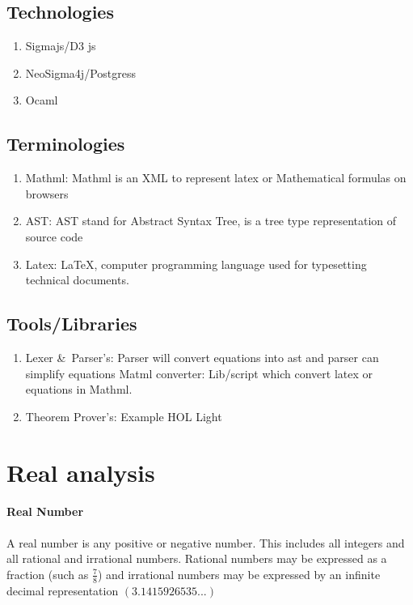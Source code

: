 \documentclass[15]{article}
\begin{document}
\subsection*{Technologies}


\begin{enumerate}
\item Sigmajs/D3 js
\item NeoSigma4j/Postgress
\item Ocaml 
   
\end{enumerate}

\subsection*{Terminologies}

\begin{enumerate}
\item Mathml: Mathml is an XML to represent latex or Mathematical formulas  on browsers
\item AST: AST stand for Abstract Syntax Tree, is  a tree type representation of source code
\item Latex: LaTeX, computer programming language used for typesetting technical documents. 


\end{enumerate}



\subsection*{Tools/Libraries}

\begin{enumerate}
\item Lexer \&\ Parser's:  Parser will convert equations into ast and parser can simplify equations
Matml converter: Lib/script which convert latex or equations in Mathml.

\item Theorem Prover's: Example HOL Light

\end{enumerate}
\pagebreak

\section{Real analysis}

\paragraph{Real Number}
A real number is any positive or negative number. This includes all integers and all rational and irrational numbers. Rational numbers may be expressed as a fraction (such as $\frac{7}{8}$) and irrational numbers may be expressed by an infinite decimal representation $ (3.1415926535...)$
\end{document}
